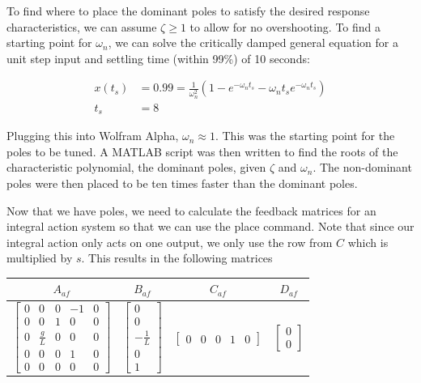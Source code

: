 \documentclass[12pt]{article}
\begin{document}
To find where to place the dominant poles to satisfy the desired response characteristics, we can assume $\zeta \ge 1$ to allow for no overshooting. To find a starting point for $\omega_n$, we can solve the critically damped general equation for a unit step input and settling time (within 99\%) of 10 seconds:

\begin{align*}
    x(t_s) &= 0.99 = \frac{1}{\omega_n^2}(1-e^{-\omega_nt_s} - \omega_nt_se^{-\omega_nt_s}) \\
    t_s &= 8
\end{align*}

Plugging this into Wolfram Alpha, $\omega_n \approx 1$. This was the starting point for the poles to be tuned. A MATLAB script was then written to find the roots of the characteristic polynomial, the dominant poles, given $\zeta$ and $\omega_n$. The non-dominant poles were then placed to be ten times faster than the dominant poles.

Now that we have poles, we need to calculate the feedback matrices for an integral action system so that we can use the place command. Note that since our integral action only acts on one output, we only use the row from $C$ which is multiplied by $s$. This results in the following matrices

\begin{center}
    \begin{tabular}{| c | c | c | c |}
        \hline
        $A_{af}$ & $B_{af}$ & $C_{af}$ & $D_{af}$ \\
        \hline
        $\begin{bmatrix}
                0 & 0 & 0 & -1 & 0 \\
                0 & 0 & 1 & 0 & 0 \\
                0 & \frac{g}{L} & 0 & 0 & 0 \\
                0 & 0 & 0 & 1 & 0 \\
                0 & 0 & 0 & 0 & 0
        \end{bmatrix}$
        &
        $\begin{bmatrix}
                0 \\ 0 \\ -\frac{1}{L} \\ 0 \\ 1
        \end{bmatrix}$
        &
        $\begin{bmatrix}
                0 & 0 & 0 & 1 & 0
        \end{bmatrix}$
        &
        $\begin{bmatrix}
                0 \\ 0
        \end{bmatrix}$ \\
        \hline
    \end{tabular}
\end{center}
\end{document}

